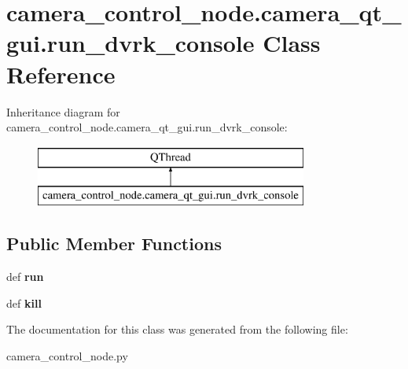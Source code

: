 \hypertarget{classcamera__control__node_1_1camera__qt__gui_1_1run__dvrk__console}{\section{camera\-\_\-control\-\_\-node.\-camera\-\_\-qt\-\_\-gui.\-run\-\_\-dvrk\-\_\-console Class Reference}
\label{classcamera__control__node_1_1camera__qt__gui_1_1run__dvrk__console}
}
Inheritance diagram for camera\-\_\-control\-\_\-node.\-camera\-\_\-qt\-\_\-gui.\-run\-\_\-dvrk\-\_\-console\-:\begin{figure}[H]
\begin{center}
\leavevmode
\includegraphics[height=2.000000cm]{classcamera__control__node_1_1camera__qt__gui_1_1run__dvrk__console}
\end{center}
\end{figure}
\subsection*{Public Member Functions}
\begin{DoxyCompactItemize}
\item 
\hypertarget{classcamera__control__node_1_1camera__qt__gui_1_1run__dvrk__console_a950f4ed0605a6e98ddfff327c6051b98}{def {\bfseries run}}\label{classcamera__control__node_1_1camera__qt__gui_1_1run__dvrk__console_a950f4ed0605a6e98ddfff327c6051b98}

\item 
\hypertarget{classcamera__control__node_1_1camera__qt__gui_1_1run__dvrk__console_a384f8f61a8d2a9b8c870223438f48502}{def {\bfseries kill}}\label{classcamera__control__node_1_1camera__qt__gui_1_1run__dvrk__console_a384f8f61a8d2a9b8c870223438f48502}

\end{DoxyCompactItemize}


The documentation for this class was generated from the following file\-:\begin{DoxyCompactItemize}
\item 
camera\-\_\-control\-\_\-node.\-py\end{DoxyCompactItemize}
